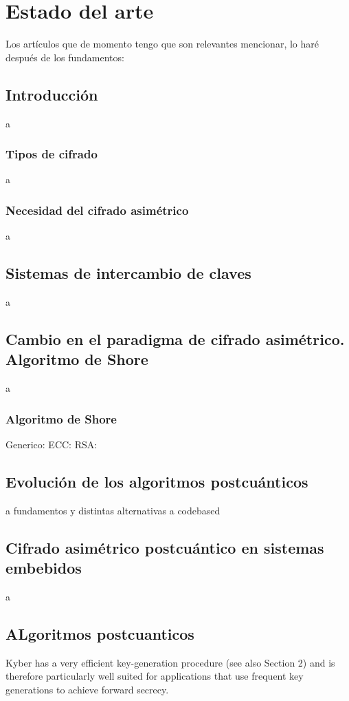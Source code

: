 \chapter{Estado del arte}
Los artículos que de momento tengo que son relevantes mencionar, lo haré después de los fundamentos:
\cite{NIST_IR_8413_2022} \cite{NIST_IR_8545_2025} \cite{011318_1_5.0179566} \cite{s11042-024-20535-x} \cite{A_COMPARATIVE_REVIEW_OF_DATA_ENCRYPTION_METHODS_IN_THE_USA_AND_EUROPE} \cite{An_Overview_and_Analysis_of_Hybrid_Encryption_The_Combination_of_Symmetric_Encryption_and_Asymmetric_Encryption} \cite{Comparative_Analysis_of_Energy_Costs_of_Asymmetric_vs_Symmetric_Encryption-Based_Security_Applications} \cite{First-Order-Masked-Kyber-on-ARM Cortex-M4} \cite{2022-414} \cite{An_overview_of_Quantum_Cryptography_and} \cite{2502.12252v1} \cite{Quantum_Resistance_Saber-Based_Group_Key_Exchange_Protocol_for_IoT} \cite{NISTFIPS203}
\section{Introducción}
a
\subsection{Tipos de cifrado}
a
\subsection{Necesidad del cifrado asimétrico}
a
\section{Sistemas de intercambio de claves}
a
\section{Cambio en el paradigma de cifrado asimétrico. Algoritmo de Shore}
a
\subsection{Algoritmo de Shore}
Generico: \cite{9508027v2} ECC: \cite{0301141v2} RSA: \cite{RESERCHFINAL}
\section{Evolución de los algoritmos postcuánticos}
a fundamentos y distintas alternativas a codebased \cite{SurveyCOdeBAsed}
\section{Cifrado asimétrico postcuántico en sistemas embebidos}
a
\section{ALgoritmos postcuanticos}

Kyber has a very efficient key-generation procedure (see also Section 2) and is therefore particularly well
suited for applications that use frequent key generations to achieve forward secrecy. \cite{kyber-spec-2021}